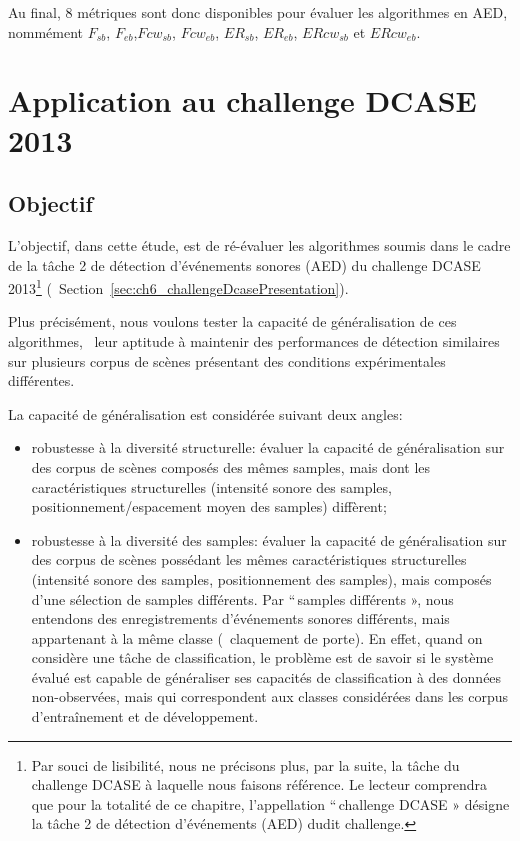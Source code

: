 Au final, 8 métriques sont donc disponibles pour évaluer les algorithmes en AED, nommément $F_{sb}$, $F_{eb}$,$Fcw_{sb}$, $Fcw_{eb}$, $ER_{sb}$, $ER_{eb}$, $ERcw_{sb}$ et $ERcw_{eb}$.


\section{Application au challenge DCASE  2013}
\label{sec:ch5_appDcase2013}

\subsection{Objectif}

L'objectif, dans cette étude, est de ré-évaluer les algorithmes soumis dans le cadre de la tâche 2 de détection d'événements sonores (AED) du challenge DCASE 2013\footnote{Par souci de lisibilité, nous ne précisons plus, par la suite, la tâche du challenge DCASE à laquelle nous faisons référence. Le lecteur comprendra que pour la totalité de ce chapitre, l'appellation ``\,challenge DCASE » désigne la tâche 2 de détection d'événements (AED) dudit challenge.} (\cf~Section~\ref{sec:ch6_challengeDcasePresentation}).

Plus précisément, nous voulons tester la capacité de généralisation de ces algorithmes, \ie~leur aptitude à maintenir des performances de détection similaires sur plusieurs corpus de scènes présentant des conditions expérimentales différentes.

La capacité de généralisation est considérée suivant deux angles:

\begin{itemize}
\item robustesse à la diversité structurelle: évaluer la capacité de généralisation sur des corpus de scènes composés des mêmes samples, mais dont les caractéristiques structurelles (intensité sonore des samples, positionnement/espacement moyen des samples) diffèrent;
\item robustesse à la diversité des samples: évaluer la capacité de généralisation sur des corpus de scènes possédant les mêmes caractéristiques structurelles (intensité sonore des samples, positionnement des samples), mais composés d'une sélection de samples différents. Par ``\,samples différents », nous entendons des enregistrements d'événements sonores différents, mais appartenant à la même classe (\eg~claquement de porte). En effet, quand on considère une tâche de classification, le problème est de savoir si le système évalué est capable de généraliser ses capacités de classification à des données non-observées, mais qui correspondent aux classes considérées dans les corpus d’entraînement et de développement.
\end{itemize}

